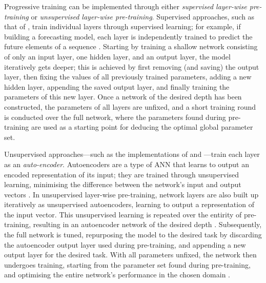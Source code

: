 \documentclass[a4paper, 11pt]{report}
\begin{document}
    Progressive training can be implemented through either \emph{supervised layer-wise pre-training} or \emph{unsupervised layer-wise pre-training}. Supervised approaches, such as that of \citet{ienco-2019}, train individual layers through supervised learning; for example, if building a forecasting model, each layer is independently trained to predict the future elements of a sequence \citep{xu-2018}. Starting by training a shallow network consisting of only an input layer, one hidden layer, and an output layer, the model iteratively gets deeper; this is achieved by first removing (and saving) the output layer, then fixing the values of all previously trained parameters, adding a new hidden layer, appending the saved output layer, and finally training the parameters of this new layer. Once a network of the desired depth has been constructed, the parameters of all layers are unfixed, and a short training round is conducted over the full network, where the parameters found during pre-training are used as a starting point for deducing the optimal global parameter set. 

    Unsupervised approaches---such as the implementations of \citet{xu-2018} and \citet{sagheer-2019}---train each layer as an \emph{auto-encoder}. Autoencoders are a type of ANN that learns to output an encoded representation of its input; they are trained through unsupervised learning, minimising the difference between the network's input and output vectors \citep{pinaya-2019}. In unsupervised layer-wise pre-training, network layers are also built up iteratively as unsupervised autoencoders, learning to output a representation of the input vector. This unsupervised learning is repeated over the entirity of pre-training, resulting in an autoencoder network of the desired depth \citep{sagheer-2019}. Subsequently, the full network is tuned, repurposing the model to the desired task by discarding the autoencoder output layer used during pre-training, and appending a new output layer for the desired task. With all parameters unfixed, the network then undergoes training, starting from the parameter set found during pre-training, and optimising the entire network's performance in the chosen domain \citep{sagheer-2019}.
\end{document}
